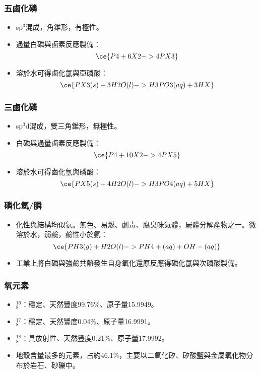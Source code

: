 \documentclass[a4paper,12pt]{report}
\begin{document}
\subsubsection{五鹵化磷}
\begin{itemize}
\item sp$^3$混成，角錐形，有極性。
\item 過量白磷與鹵素反應製備：
\[\ce{P4 + 6X2 -> 4PX3}\]
\item 溶於水可得鹵化氫與亞磷酸：
\[\ce{PX3(s) + 3H2O(l) -> H3PO3(aq) + 3HX}\]
\end{itemize}
\subsubsection{三鹵化磷}
\begin{itemize}
\item sp$^3$d混成，雙三角錐形，無極性。
\item 白磷與過量鹵素反應製備：
\[\ce{P4 + 10X2 -> 4PX5}\]
\item 溶於水可得鹵化氫與磷酸：
\[\ce{PX5(s) + 4H2O(l) -> H3PO4(aq) + 5HX}\]
\end{itemize}
\subsubsection{磷化氫/膦}
\begin{itemize}
\item 化性與結構均似氨。無色、易燃、劇毒、腐臭味氣體，屍體分解產物之一。微溶於水，弱鹼，鹼性小於氨：
\[\ce{PH3(g) + H2O(l) -> PH4+(aq) + OH-(aq)}\]
\item 工業上將白磷與強鹼共熱發生自身氧化還原反應得磷化氫與次磷酸製備。
\end{itemize}
\subsubsection{氧元素}
\begin{itemize}
\item $^{16}_8$\rmO：穩定、天然豐度99.76\%、原子量15.9949。
\item $^{17}_8$\rmO：穩定、天然豐度0.04\%、原子量16.9991。
\item $^{18}_8$\rmO：具放射性、天然豐度0.21\%、原子量17.9992。
\item 地殼含量最多的元素，占約46.1\%，主要以二氧化矽、矽酸鹽與金屬氧化物分布於岩石、砂礫中。
\end{itemize}
\end{document}
